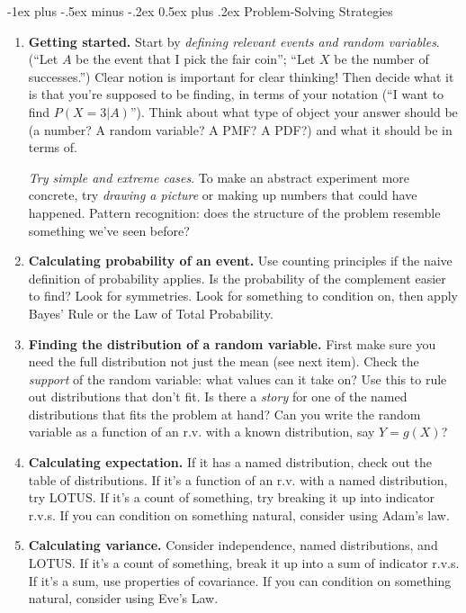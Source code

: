 \documentclass[6pt, landscape]{article}
\makeatletter
\renewcommand{\section}{\@startsection{section}{1}{0mm}%
                                {-1ex plus -.5ex minus -.2ex}%
                                {0.5ex plus .2ex}%
                                {\normalfont\bfseries}}
\makeatother
\begin{document}
\begin{multicols}{3}
        \section{Problem-Solving Strategies}
        \begin{enumerate}
                \item \textbf{Getting started.} Start by \emph{defining relevant events and random variables}. (``Let $A$ be the event that I pick the fair coin''; ``Let $X$ be the number of successes.'') Clear notion is important for clear thinking! Then decide what it is that you're supposed to be finding, in terms of your notation (``I want to find $P(X=3|A)$''). Think about what type of object your answer should be (a number? A random variable? A PMF? A PDF?) and what it should be in terms of.

                      \emph{Try simple and extreme cases}. To make an abstract experiment more concrete, try \emph{drawing a picture} or making up numbers that could have happened. Pattern recognition: does the structure of the problem resemble something we've seen before?
                \item \textbf{Calculating probability of an event.} Use counting principles if the naive definition of probability applies. Is the probability of the complement easier to find? Look for symmetries. Look for something to condition on, then apply Bayes' Rule or the Law of Total Probability.
                \item \textbf{Finding the distribution of a random variable.} First make sure you need the full distribution not just the mean (see next item). Check the \emph{support} of the random variable: what values can it take on? Use this to rule out distributions that don't fit.  Is there a \emph{story} for one of the named distributions that fits the problem at hand?  Can you write the random variable as a function of an r.v. with a known distribution, say $Y = g(X)$?
                \item \textbf{Calculating expectation.} If it has a named distribution, check out the table of distributions. If it's a function of an r.v. with a named distribution, try LOTUS. If it's a count of something, try breaking it up into indicator r.v.s. If you can condition on something natural, consider using Adam's law.
                \item \textbf{Calculating variance.} Consider independence, named distributions, and LOTUS. If it's a count of something, break it up into a sum of indicator r.v.s. If it's a sum, use properties of covariance. If you can condition on something natural, consider using Eve's Law.

\end{enumerate}
\end{multicols}
\end{document}
